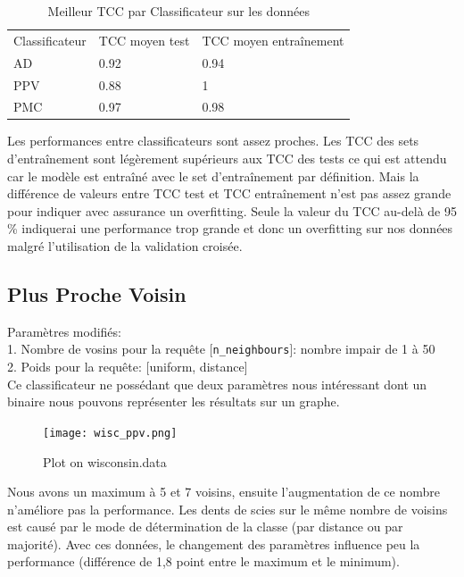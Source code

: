 \documentclass[10pt,letterpaper]{article}
\newlength\savedwidth
\newcommand\thickhline{\noalign{\global\savedwidth\arrayrulewidth\global\arrayrulewidth 2pt}%
\hline
\noalign{\global\arrayrulewidth\savedwidth}}
\begin{document}
\begin{table}[h]
  \centering
  \caption{Meilleur TCC par Classificateur sur les données  \protect{}}
\begin{tabular}{lll}
\hline
Classificateur & TCC moyen test 
 & TCC moyen entraînement
\\ \thickhline
AD & \hspace{5mm}0.92 & \hspace{20mm}0.94
 \\ \hline
PPV & \hspace{5mm}0.88 & \hspace{20mm}1 \\ \hline
PMC & \hspace{5mm}0.97 & \hspace{20mm}0.98\\ \hline
\end{tabular}
\end{table}
Les performances entre classificateurs sont assez proches. 
Les TCC des sets d’entraînement sont légèrement supérieurs aux TCC des tests ce qui est attendu car le modèle est entraîné avec le set d’entraînement par définition. Mais la différence de valeurs entre TCC test et TCC entraînement n’est pas assez grande pour indiquer avec assurance un overfitting. 
Seule la valeur du TCC au-delà de 95 \% indiquerai une performance trop grande et donc un overfitting sur nos données malgré l’utilisation de la validation croisée.

\subsection*{Plus Proche Voisin}
Paramètres modifiés:\\
1. Nombre de vosins pour la requête [\verb!n_neighbours!]: nombre impair de 1 à 50\\
2. Poids pour la requête: [uniform, distance]\\
\vspace{1mm}
Ce classificateur ne possédant que deux paramètres nous intéressant dont un binaire nous pouvons représenter les résultats sur un graphe.

\begin{figure}[H]
\centering
\texttt{[image: wisc\_ppv.png]}
\caption{Plot on wisconsin.data}
\end{figure}
Nous avons un maximum à 5 et 7 voisins, ensuite l’augmentation de ce nombre n’améliore pas la performance. Les dents de scies sur le même nombre de voisins est causé par le mode de détermination de la classe (par distance ou par majorité). Avec ces données, le changement des paramètres influence peu la performance (différence de 1,8 point entre le maximum et le minimum).
\end{document}
